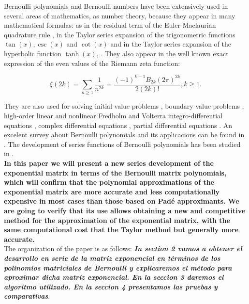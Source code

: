 \documentclass[preprint,10pt]{elsarticle}
\begin{document}
Bernoulli polynomials and Bernoulli numbers have been extensively used in several areas of mathematics, as number theory, because they appear in many mathematical formulas: as in the residual term of the Euler-Maclaurian quadrature rule \cite[p. 63]{olver2010nist}, in the Taylor series expansion of the trigonometric functions $\tan{(x)}, \csc{(x)}$ and $\cot{(x)}$ \cite[p. 116-117]{olver2010nist} and in the Taylor series expansion of the hyperbolic function $\tanh{(x)}$,  \cite[p. 125]{olver2010nist}. They also appear in the well known exact expression  of the  even values of the Riemann zeta function:

$$
\xi(2k)=\sum_{n \geq 1} \frac{1}{n^{2k}}=\frac{(-1)^{k-1}B_{2k}(2\pi)^{2k}}{2(2k)!} , k \geq 1.
$$

They are also used for solving initial value problems \cite{tohidi2013new}, boundary value problems \cite{islam2013numerical,tohidi2013collocation}, high-order linear and nonlinear Fredholm and Volterra integro-differential equations \cite{bhrawy2012new,tohidi2014numerical}, complex differential equations \cite{toutounian2013collocation}, partial differential equations \cite{tohidi2014convergence,tohidi2016new, toutounian2013new}. An excelent survey about Bernoulli polynomials and its applicacions can be found in  \cite{kouba2013lecture}. The development of series functions of Bernoulli polynomials has been studied in \cite{costabile2001expansion,costabile2001expansions}.\\


\textbf{ In this paper we will present a new series development of the exponential matrix in terms of the Bernoulli matrix polynomials, which will confirm that
the polynomial approximations of the exponential matrix are more accurate
and less computationally expensive in most cases than those based on Pad\'{e}
approximants. We are going to verify that its use allows obtaining a new and competitive method for the
approximation of the exponential matrix, with the same computational cost that the Taylor method but generally more accurate.} \\



The organization of the paper is as follows: \textbf{\emph{In section 2 vamos a obtener el desarrollo en serie de la matriz exponencial en t\'erminos de los polinomios matriciales de Bernoulli y explicaremos el m\'etodo para aproximar dicha matriz exponencial. En la seccion 3 daremos el algoritmo utilizado. En la seccion 4 presentamos las pruebas y comparativas}}.\\
\end{document}
